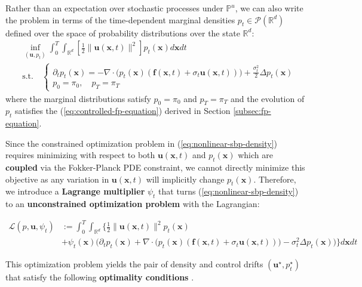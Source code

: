 \documentclass{article}
\newcommand{\boldtext}[1]{\textbf{\textcolor{MyGreen}{#1}}}
\begin{document}
Rather than an expectation over stochastic processes under $\mathbb{P}^u$, we can also write the problem in terms of the time-dependent marginal densities $p_t\in \mathcal{P}(\mathbb{R}^d)$ defined over the space of probability distributions over the state $\mathbb{R}^d$:
\begin{align}
    &\inf_{(\boldsymbol{u}, p_t)}\int_0^T\int_{\mathbb{R}^d}\left[\frac{1}{2}\|\boldsymbol{u}(\boldsymbol{x},t)\|^2\right]p_t(\boldsymbol{x}) d\boldsymbol{x}dt\tag{Density Dynamic SB Problem}\label{eq:nonlinear-sbp-density}\\ &\text{s.t.}\quad \begin{cases}
        \partial_tp_t(\boldsymbol{x})=-\nabla\cdot\big(p_t(\boldsymbol{x})(\boldsymbol{f}(\boldsymbol{x},t) +\sigma_t\boldsymbol{u}(\boldsymbol{x},t))\big)+\frac{\sigma_t^2}{2}\Delta p_t(\boldsymbol{x})\\
        p_0= \pi_0, \quad p_T=\pi_T
    \end{cases}\nonumber
\end{align}
where the marginal distributions satisfy $p_0=\pi_0$ and $p_T=\pi_T$ and the evolution of $p_t$ satisfies the (\ref{eq:controlled-fp-equation}) derived in Section \ref{subsec:fp-equation}.

Since the constrained optimization problem in (\ref{eq:nonlinear-sbp-density}) requires minimizing with respect to both $\boldsymbol{u}(\boldsymbol{x},t)$ and $p_t(\boldsymbol{x})$ which are \textbf{coupled} via the Fokker-Planck PDE constraint, we cannot directly minimize this objective as any variation in $\boldsymbol{u}(\boldsymbol{x},t)$ will implicitly change $p_t(\boldsymbol{x})$. Therefore, we introduce a \boldtext{Lagrange multiplier} $\psi_t$ that turns (\ref{eq:nonlinear-sbp-density}) to an \textbf{unconstrained optimization problem} with the Lagrangian: 
\begin{small}
\begin{align}
    \mathcal{L}(p,\boldsymbol{u},\psi_t)&:=\int_0^T\int_{\mathbb{R}^d}\bigg\{\frac{1}{2}\|\boldsymbol{u}(\boldsymbol{x},t)\|^2 p_t(\boldsymbol{x})\nonumber\\
    &+\psi_t(\boldsymbol{x})\bigg(\partial_tp_t(\boldsymbol{x})+\nabla\cdot\big(p_t(\boldsymbol{x})(\boldsymbol{f}(\boldsymbol{x},t) +\sigma_t\boldsymbol{u}(\boldsymbol{x},t))\big)-\sigma_t^2\Delta p_t(\boldsymbol{x})\bigg)\bigg\}d\boldsymbol{x}dt\label{eq:nonlinear-lagrangian}
\end{align}
\end{small}

This optimization problem yields the pair of density and control drifts $(\boldsymbol{u}^\star, p^\star_t)$ that satisfy the following \boldtext{optimality conditions} \citep{caluya2021wasserstein}.
\end{document}
